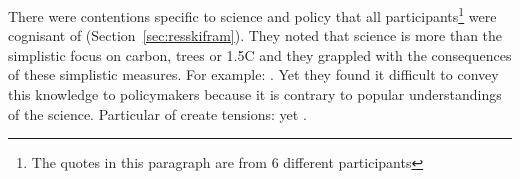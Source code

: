 There were contentions specific to \CAN{} science and policy that all participants\footnote{The quotes in this paragraph are from 6 different participants} were cognisant of (Section~\ref{sec:resskifram}). They noted that \CAN{} science is more than the simplistic focus on carbon, trees or 1.5\degree C and they grappled with the consequences of these simplistic measures. For example: . Yet they found it difficult to convey this knowledge to policymakers because it is contrary to popular understandings of the science. Particular \skifram{} of \CAN{} create tensions:   yet . %
